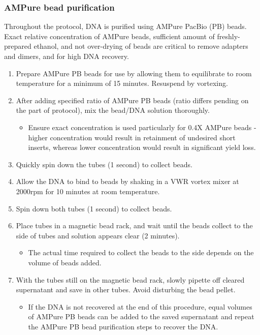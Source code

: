 \subsubsection{AMPure bead purification}
\label{proto: ampure}
Throughout the protocol, DNA is purified using AMPure PacBio (PB) beads. Exact relative concentration of AMPure beads, sufficient amount of freshly-prepared ethanol, and not over-drying of beads are critical to remove adapters and dimers, and for high DNA recovery.   
\label{general_ampure_bead_purification}
\begin{enumerate}
	\item Prepare AMPure PB beads for use by allowing them to equilibrate to room temperature for a minimum of 15 minutes. Resuspend by vortexing.
	\item After adding specified ratio of AMPure PB beads (ratio differs pending on the part of protocol), mix the bead/DNA solution thoroughly.
	\begin{itemize}
		\item Ensure exact concentration is used particularly for 0.4X AMPure beads - higher concentration would result in retainment of undesired short inserts, whereas lower concentration would result in significant yield loss. 
	\end{itemize} 
	\item Quickly spin down the tubes (1 second) to collect beads. 
	\item Allow the DNA to bind to beads by shaking in a VWR vortex mixer at 2000rpm for 10 minutes at room temperature. 
	\item Spin down both tubes (1 second) to collect beads. 
	\item Place tubes in a magnetic bead rack, and wait until the beads collect to the side of tubes and solution appears clear (2 minutes).
	\begin{itemize}
		\item The actual time required to collect the beads to the side depends on the volume of beads added.
	\end{itemize} 
	\item With the tubes still on the magnetic bead rack, slowly pipette off cleared supernatant and save in other tubes. Avoid disturbing the bead pellet.
		\begin{itemize}
		\item If the DNA is not recovered at the end of this procedure, equal volumes of AMPure PB beads can be added to the saved supernatant and repeat the AMPure PB bead purification steps to recover the DNA.

\end{itemize}
\end{enumerate}

